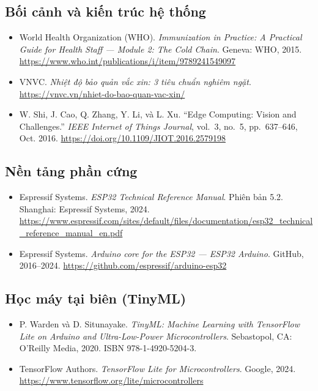 \documentclass[12pt,a4paper]{report}
\begin{document}
\subsection*{Bối cảnh và kiến trúc hệ thống}
\begin{itemize}[leftmargin=1.5em]

\item World Health Organization (WHO). \textit{Immunization in Practice: A Practical Guide for Health Staff --- Module 2: The Cold Chain}. Geneva: WHO, 2015. \url{https://www.who.int/publications/i/item/9789241549097}

\item VNVC. \textit{Nhiệt độ bảo quản vắc xin: 3 tiêu chuẩn nghiêm ngặt}. \url{https://vnvc.vn/nhiet-do-bao-quan-vac-xin/}

\item W. Shi, J. Cao, Q. Zhang, Y. Li, và L. Xu. ``Edge Computing: Vision and Challenges.'' \textit{IEEE Internet of Things Journal}, vol.~3, no.~5, pp.~637--646, Oct. 2016. \url{https://doi.org/10.1109/JIOT.2016.2579198}

\end{itemize}

\subsection*{Nền tảng phần cứng}
\begin{itemize}[leftmargin=1.5em]

\item Espressif Systems. \textit{ESP32 Technical Reference Manual}. Phiên bản 5.2. Shanghai: Espressif Systems, 2024. \url{https://www.espressif.com/sites/default/files/documentation/esp32_technical_reference_manual_en.pdf}

\item Espressif Systems. \textit{Arduino core for the ESP32 --- ESP32 Arduino}. GitHub, 2016--2024. \url{https://github.com/espressif/arduino-esp32}

\end{itemize}

\subsection*{Học máy tại biên (TinyML)}
\begin{itemize}[leftmargin=1.5em]

\item P. Warden và D. Situnayake. \textit{TinyML: Machine Learning with TensorFlow Lite on Arduino and Ultra-Low-Power Microcontrollers}. Sebastopol, CA: O'Reilly Media, 2020. ISBN 978-1-4920-5204-3.

\item TensorFlow Authors. \textit{TensorFlow Lite for Microcontrollers}. Google, 2024. \url{https://www.tensorflow.org/lite/microcontrollers}

\end{itemize}
\end{document}
